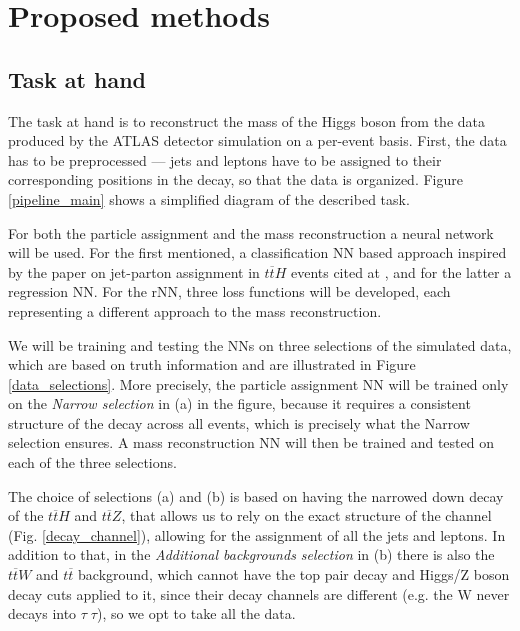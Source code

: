 \documentclass{ctuthesis}
\begin{document}
\chapter{Proposed methods}
\section{Task at hand}
\label{task_at_hand}
The task at hand is to reconstruct the mass of the Higgs boson from the data produced by the ATLAS detector simulation on a per-event basis. First, the data has to be preprocessed — jets and leptons have to be assigned to their corresponding positions in the decay, so that the data is organized. Figure \ref{pipeline_main} shows a simplified diagram of the described task.

\begin{figure}[h]
\end{figure}

For both the particle assignment and the mass reconstruction a neural network will be used. For the first mentioned, a classification NN based approach inspired by the paper on jet-parton assignment in $t\overline{t}H$ events cited at \cite{parton_assignment}, and for the latter a regression NN. For the rNN, three loss functions will be developed, each representing a different approach to the mass reconstruction.

We will be training and testing the NNs on three selections of the simulated data, which are based on truth information and are illustrated in Figure \ref{data_selections}. More precisely, the particle assignment NN will be trained only on the \emph{Narrow selection} in (a) in the figure, because it requires a consistent structure of the decay across all events, which is precisely what the Narrow selection ensures. A mass reconstruction NN will then be trained and tested on each of the three selections.

The choice of selections (a) and (b) is based on having the narrowed down decay of the $t\overline{t}H$ and $t\overline{t}Z$, that allows us to rely on the exact structure of the channel (Fig. \ref{decay_channel}), allowing for the assignment of all the jets and leptons. In addition to that, in the \emph{Additional backgrounds selection} in (b) there is also the $t\overline{t}W$ and $t\overline{t}$ background, which cannot have the top pair decay and Higgs/Z boson decay cuts applied to it, since their decay channels are different (e.g. the W never decays into $\tau\;\tau$), so we opt to take all the data.
\end{document}

